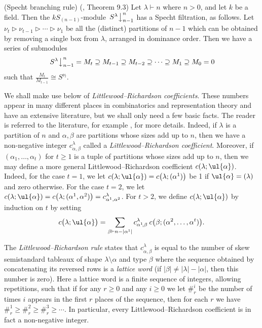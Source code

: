\begin{theo}\textup{(}Specht branching rule\textup{)}\label{jam_branch_rule_sn:thm}
(\cite{JAMSN}, Theorem 9.3) Let $\lambda \vdash n$ where $n > 0$, and let $k$ be a field. Then the $kS_{(n-1)}$-module
$\left.S^\lambda\right\downarrow^n_{n-1}$ has a Specht filtration, as follows. Let
$\nu_t \triangleright \nu_{t-1} \triangleright \cdots \triangleright \nu_1$ be all the (distinct) partitions of $n-1$ which can be
obtained by removing a single box from $\lambda$, arranged in dominance order. Then we have a series of submodules
\[ \left.S^\lambda\right\downarrow^n_{n-1}  = M_t \supseteq M_{t-1} \supseteq M_{t-2} \supseteq \cdots \supseteq M_1 \supseteq M_0 = 0 \]
such that $\frac{M_l}{M_{l-1}} \cong S^{\nu_l}$.
\end{theo}

We shall make use below of \textit{Littlewood--Richardson coefficients}. These numbers appear in many different places in combinatorics and
representation theory and have an extensive literature, but we shall only need a few basic facts. The reader is referred to the
literature, for example \cite[Chapter 7]{STANEC}, for more details. Indeed, if $\lambda$ is a partition
of $n$ and $\alpha, \beta$ are partitions whose sizes add up to $n$, then we have a non-negative integer $c^\lambda_{\alpha,\beta}$ called
a \textit{Littlewood--Richardson coefficient}. Moreover, if $(\alpha_1,\ldots,\alpha_t)$ for $t \geq 1$ is a tuple of partitions whose
sizes add up to $n$, then we may define a more general Littlewood--Richardson coefficient $c(\lambda;\ul{\alpha})$. Indeed, for the case
$t = 1$, we let $c(\lambda;\ul{\alpha}) = c\bigl(\lambda;(\alpha^1)\bigr)$ be 1 if $\ul{\alpha} = (\lambda)$ and zero otherwise.
For the case $t=2$, we let $c(\lambda;\ul{\alpha}) = c\bigl(\lambda;(\alpha^1,\alpha^2)\bigr) = c^\lambda_{\alpha^1,\alpha^2}$.
For $t > 2$, we define $c(\lambda;\ul{\alpha})$ by induction on $t$ by setting
\begin{equation}\label{lrr_coeff_take_one_off:eq}
c\bigl(\lambda; \ul{\alpha}\bigr) =
\sum_{\beta \vdash n - |\alpha^1|}c^\lambda_{\alpha^1\!,\beta}\:c\bigl(\beta;(\alpha^2,\ldots,\alpha^t)\bigr).
\end{equation}

The \textit{Littlewood--Richardson rule} \cite[Theorem A1.3.3]{STANEC} states that  $c^\lambda_{\alpha,\beta}$ is equal to the number of skew
semistandard tableaux of shape $\lambda \setminus \alpha$ and type $\beta$ where the sequence obtained by concatenating its reversed
rows is a \textit{lattice word} (if $|\beta| \neq |\lambda|-|\alpha|$, then this number is zero). Here a lattice word is a finite
sequence of integers, allowing repetitions, such that if for any $r\geq0$ and any $i\geq0$ we let $\#^i_r$ be the number of times $i$
appears in the first $r$ places of the sequence, then for each $r$ we have $\#^1_r \geqslant \#^2_r \geqslant \#^3_r \geqslant \cdots$.
In particular, every Littlewood--Richardson coefficient is in fact a non-negative integer.

